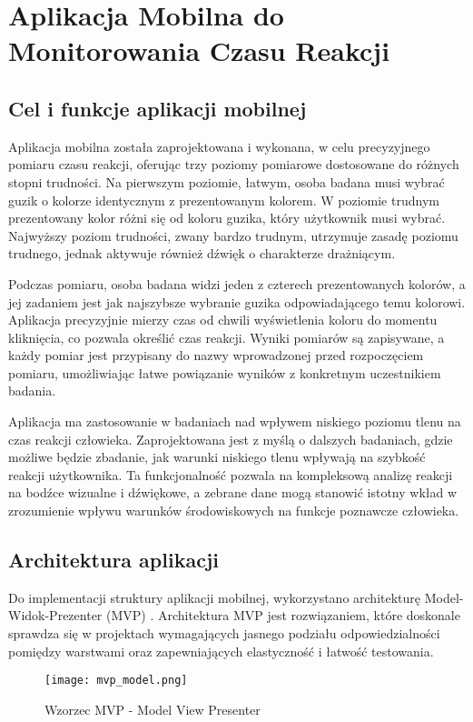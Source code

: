 \chapter{Aplikacja Mobilna do Monitorowania Czasu Reakcji}
\section{Cel i funkcje aplikacji mobilnej}
Aplikacja mobilna została zaprojektowana i wykonana, w celu precyzyjnego pomiaru czasu reakcji, oferując trzy poziomy pomiarowe dostosowane do różnych stopni trudności. Na pierwszym poziomie, łatwym, osoba badana musi wybrać guzik o kolorze identycznym z prezentowanym kolorem. W poziomie trudnym prezentowany kolor różni się od koloru guzika, który użytkownik musi wybrać. Najwyższy poziom trudności, zwany bardzo trudnym, utrzymuje zasadę poziomu trudnego, jednak aktywuje również dźwięk o charakterze drażniącym.

Podczas pomiaru, osoba badana widzi jeden z czterech prezentowanych kolorów, a jej zadaniem jest jak najszybsze wybranie guzika odpowiadającego temu kolorowi. Aplikacja precyzyjnie mierzy czas od chwili wyświetlenia koloru do momentu kliknięcia, co pozwala określić czas reakcji. Wyniki pomiarów są zapisywane, a każdy pomiar jest przypisany do nazwy wprowadzonej przed rozpoczęciem pomiaru, umożliwiając łatwe powiązanie wyników z konkretnym uczestnikiem badania.

Aplikacja ma zastosowanie w badaniach nad wpływem niskiego poziomu tlenu na czas reakcji człowieka. Zaprojektowana jest z myślą o dalszych badaniach, gdzie możliwe będzie zbadanie, jak warunki niskiego tlenu wpływają na szybkość reakcji użytkownika. Ta funkcjonalność pozwala na kompleksową analizę reakcji na bodźce wizualne i dźwiękowe, a zebrane dane mogą stanowić istotny wkład w zrozumienie wpływu warunków środowiskowych na funkcje poznawcze człowieka.

\section{Architektura aplikacji}
Do implementacji struktury aplikacji mobilnej, wykorzystano architekturę Model-Widok-Prezenter (MVP) . Architektura MVP jest rozwiązaniem, które doskonale sprawdza się w projektach wymagających jasnego podziału odpowiedzialności pomiędzy warstwami oraz zapewniających elastyczność i łatwość testowania. 
\begin{figure}[!htb]
    \centering
    \texttt{[image: mvp\_model.png]}
    \caption{Wzorzec MVP - Model View Presenter~\cite{MVP}}
\end{figure}

